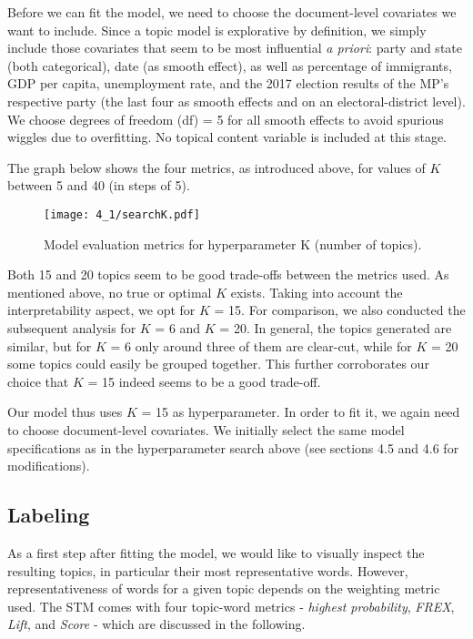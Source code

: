 \documentclass[12pt]{article}
\begin{document}
Before we can fit the model, we need to choose the document-level covariates we want to include. Since a topic model is explorative by definition, we simply include those covariates that seem to be most influential \textit{a priori}: party and state (both categorical), date (as smooth effect), as well as percentage of immigrants, GDP per capita, unemployment rate, and the 2017 election results of the MP's respective party (the last four as smooth effects and on an electoral-district level). We choose degrees of freedom (df) = 5 for all smooth effects to avoid spurious wiggles due to overfitting. No topical content variable is included at this stage.

The graph below shows the four metrics, as introduced above, for values of $K$ between 5 and 40 (in steps of 5).

\begin{figure}[h!]
  \centering
  \captionsetup{justification=centering,margin=2cm}
  \texttt{[image: 4\_1/searchK.pdf]}
  \caption{Model evaluation metrics for hyperparameter K (number of topics).}
  \label{fig:searchK}
\end{figure}

Both 15 and 20 topics seem to be good trade-offs between the metrics used. As mentioned above, no true or optimal $K$ exists. Taking into account the interpretability aspect, we opt for $K$ = 15. For comparison, we also conducted the subsequent analysis for $K$ = 6 and $K$ = 20. In general, the topics generated are similar, but for $K$ = 6 only around three of them are clear-cut, while for $K$ = 20 some topics could easily be grouped together. This further corroborates our choice that $K$ = 15 indeed seems to be a good trade-off. 

Our model thus uses $K$ = 15 as hyperparameter. In order to fit it, we again need to choose document-level covariates. We initially select the same model specifications as in the hyperparameter search above (see sections 4.5 and 4.6 for modifications).

\subsection{Labeling}

As a first step after fitting the model, we would like to visually inspect the resulting topics, in particular their most representative words. However, representativeness of words for a given topic depends on the weighting metric used. The STM comes with four topic-word metrics - \textit{highest probability}, \textit{FREX}, \textit{Lift}, and \textit{Score} - which are discussed in the following.
\end{document}
